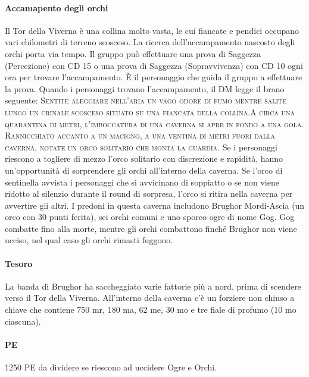 \documentclass{article}
\begin{document}
\paragraph{Accamapento degli orchi}
Il Tor della Viverna è una collina molto vasta, le cui
fiancate e pendici occupano vari chilometri di terreno scosceso. La ricerca dell’accampamento nascosto degli
orchi porta via tempo. Il gruppo può effettuare una prova
di Saggezza (Percezione) con CD 15 o una prova di
Saggezza (Sopravvivenza) con CD 10 ogni ora per trovare
l'accampamento. È il personaggio che guida il gruppo a
effettuare la prova.
Quando i personaggi trovano l'accampamento, il DM legge
il brano seguente: \textsc{Sentite aleggiare nell’aria un vago odore di fumo mentre
salite lungo un crinale scosceso situato su una fiancata della
collina.A circa una quarantina di metri, l’imboccatura di una
caverna si apre in fondo a una gola. Rannicchiato accanto a un
macigno, a una ventina di metri fuori dalla caverna, notate un
orco solitario che monta la guardia.} 
Se i personaggi riescono a togliere di mezzo l'orco solitario
con discrezione e rapidità, hanno un'opportunità di
sorprendere gli orchi all'interno della caverna. Se l'orco di
sentinella avvista i personaggi che si avvicinano di soppiatto
o se non viene ridotto al silenzio durante il round di sorpresa,
l’orco si ritira nella caverna per avvertire gli altri.
I predoni in questa caverna includono Brughor Mordi-Ascia
(un orco con 30 punti ferita), sei orchi comuni e uno sporco
ogre di nome Gog. Gog combatte fino alla morte, mentre gli
orchi combattono finché Brughor non viene ucciso, nel qual
caso gli orchi rimasti fuggono.

\paragraph{Tesoro} La banda di Brughor ha saccheggiato varie fattorie più a
nord, prima di scendere verso il Tor della Viverna. All'interno
della caverna c'è un forziere non chiuso a chiave che contiene
750 mr, 180 ma, 62 me, 30 mo e tre fiale di profumo (10
mo ciascuna).

\paragraph{PE} 1250 PE da dividere se riescono ad uccidere Ogre e Orchi.
\end{document}
